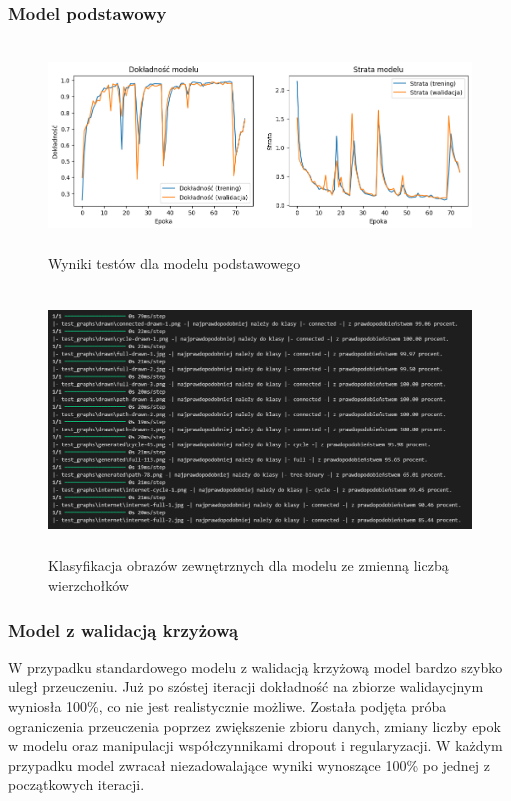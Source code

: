 \subsubsection{Model podstawowy}

\begin{figure}[ht]
	\centering
	\includegraphics[height=5.5cm]{partials/tests/images/v2_epoch75.png}
	\caption{Wyniki testów dla modelu podstawowego}
	\label{Fig:tests-base-1}
\end{figure}
\FloatBarrier

\begin{figure}[ht]
	\centering
	\includegraphics[height=7cm]{partials/tests/images/v2_epoch75_img_tests.png}
	\caption{Klasyfikacja obrazów zewnętrznych dla modelu ze zmienną liczbą wierzchołków}
	\label{Fig:tests-base-2}
\end{figure}
\FloatBarrier

\subsubsection{Model z walidacją krzyżową}

W przypadku standardowego modelu z walidacją krzyżową model bardzo szybko uległ przeuczeniu.
Już po szóstej iteracji dokładność na zbiorze walidaycjnym wyniosła 100\%, co nie jest realistycznie możliwe.
Została podjęta próba ograniczenia przeuczenia poprzez zwiększenie zbioru danych, zmiany liczby epok w modelu
oraz manipulacji współczynnikami dropout i regularyzacji.
W każdym przypadku model zwracał niezadowalające wyniki wynoszące 100\% po jednej z początkowych iteracji.

